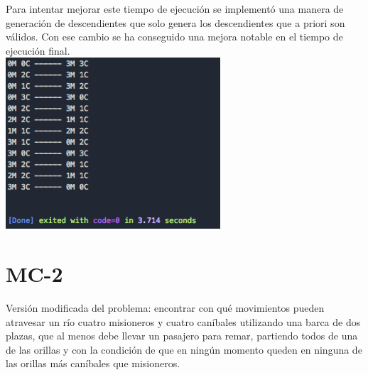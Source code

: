 \documentclass{article}
\begin{document}
Para intentar mejorar este tiempo de ejecución se implementó una manera de generación de descendientes que solo genera los descendientes que a priori son válidos. Con ese cambio se ha conseguido una mejora notable en el tiempo de ejecución final.\\
\includegraphics[width=8cm]{resources/mc-1v2} \\


\pagebreak
\section{MC-2}
Versión modificada del problema: encontrar con qué movimientos pueden atravesar un río cuatro misioneros y cuatro caníbales utilizando una barca de dos plazas, que al menos debe llevar un pasajero para remar, partiendo todos de una de las orillas y con la condición de que en ningún momento queden en ninguna de las orillas más caníbales que misioneros.
\end{document}
